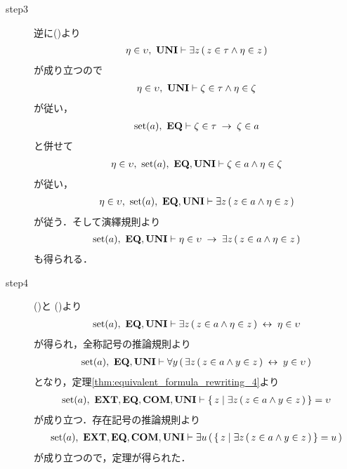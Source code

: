 \begin{sketch}
\begin{description}
			\item[step3]
				逆に()より
				\begin{align}
					\eta \in \upsilon,\ \mbox{{\bf UNI}} \vdash
					\exists z\, (\, z \in \tau \wedge \eta \in z\, )
				\end{align}
				が成り立つので
				\begin{align}
					\eta \in \upsilon,\ \mbox{{\bf UNI}} \vdash
					\zeta \in \tau \wedge \eta \in \zeta
				\end{align}
				が従い，
				\begin{align}
					\operatorname*{set} (a),\ \mbox{{\bf EQ}} \vdash
					\zeta \in \tau \hspace{0.25em}\rightarrow\hspace{0.25em} \zeta \in a
				\end{align}
				と併せて
				\begin{align}
					\eta \in \upsilon,\ \operatorname*{set} (a),\ \mbox{{\bf EQ}},\mbox{{\bf UNI}} \vdash
					\zeta \in a \wedge \eta \in \zeta
				\end{align}
				が従い，
				\begin{align}
					\eta \in \upsilon,\ \operatorname*{set} (a),\ \mbox{{\bf EQ}},\mbox{{\bf UNI}} \vdash
					\exists z\, (\, z \in a \wedge \eta \in z\, )
				\end{align}
				が従う．そして演繹規則より
				\begin{align}
					\operatorname*{set} (a),\ \mbox{{\bf EQ}},\mbox{{\bf UNI}} \vdash
					\eta \in \upsilon \hspace{0.25em}\rightarrow\hspace{0.25em} \exists z\, (\, z \in a \wedge \eta \in z\, )
					\label{fom:union_of_a_set_is_a_set_3}
				\end{align}
				も得られる．
				
			\item[step4]
				()と
				()より
				\begin{align}
					\operatorname*{set} (a),\ \mbox{{\bf EQ}},\mbox{{\bf UNI}} \vdash
					\exists z\, (\, z \in a \wedge \eta \in z\, ) \hspace{0.25em}\leftrightarrow\hspace{0.25em} \eta \in \upsilon
				\end{align}
				が得られ，全称記号の推論規則より
				\begin{align}
					\operatorname*{set} (a),\ \mbox{{\bf EQ}},\mbox{{\bf UNI}} \vdash
					\forall y\, (\, \exists z\, (\, z \in a \wedge y \in z\, ) \hspace{0.25em}\leftrightarrow\hspace{0.25em} y \in \upsilon\, )
				\end{align}
				となり，定理\ref{thm:equivalent_formula_rewriting_4}より
				\begin{align}
					\operatorname*{set} (a),\ \mbox{{\bf EXT}},\mbox{{\bf EQ}},\mbox{\bf COM},\mbox{{\bf UNI}} \vdash
					\left\{\, z \mid \exists z\, (\, z \in a \wedge y \in z\, )\, \right\} = \upsilon
				\end{align}
				が成り立つ．存在記号の推論規則より
				\begin{align}
					\operatorname*{set} (a),\ \mbox{{\bf EXT}},\mbox{{\bf EQ}},\mbox{\bf COM},\mbox{{\bf UNI}} \vdash
					\exists u\, (\, \left\{\, z \mid \exists z\, (\, z \in a \wedge y \in z\, )\, \right\} = u\, )
				\end{align}
				が成り立つので，定理が得られた．
				\QED
		\end{description}
	\end{sketch}
	
